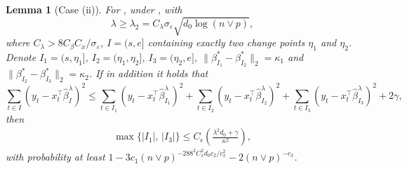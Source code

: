\documentclass[twoside]{article}
\newtheorem{lemma}[theorem]{Lemma}
\begin{document}
\begin{lemma}[Case (ii)] \label{lemma:two change point}
For , under , with 
	\[
		\lambda \geq \lambda_2 = C_{\lambda}\sigma_{\varepsilon} \sqrt{d_0 \log(n \vee p)}, 
	\]
	where $C_{\lambda} > 8C_{\beta}C_x/\sigma_{\varepsilon}$, $I = (s, e]$ containing exactly two change points $\eta_1$ and $\eta_2$.  Denote $ I_1 =(s,\eta_1] $, $I_2 = (\eta_1,\eta_2] $, $I_3 =(\eta_2,e]$, $\|  \beta_{I_1} ^*  -\beta_{I_2} ^* \|_2 = \kappa_1$ and $\|  \beta_{I_2} ^*  -\beta_{I_3} ^* \|_2 = \kappa_2$.  If in addition it holds that  
	\[
		 \sum_{t\in I } (y_t -x_t^{\top} \widehat \beta^\lambda_ I )^2 \leq \sum_{t\in I_1 } (y_t -x_t^{\top} \widehat \beta^\lambda_ {I_1}  )^2 + \sum_{t\in I_2 } (y_t -x_t^{\top} \widehat \beta^\lambda_ {I_2}  )^2  + \sum_{t\in I_3} (y_t -x_t^{\top} \widehat \beta^\lambda_ {I_3}  )^2 + 2\gamma, 
	\]
	then 
	\begin{align*}
		\max\{|I_1|, \, |I_3|\} \leq C_{\epsilon} \left(\frac{\lambda^2 d_0 + \gamma}{\kappa^2}\right),
	\end{align*} 
	with probability at least $1 - 3c_1 (n \vee p)^{-288^2C_x^2d_0c_2/c_x^2} - 2(n \vee p)^{-c_3}$.
\end{lemma} 
\end{document}
